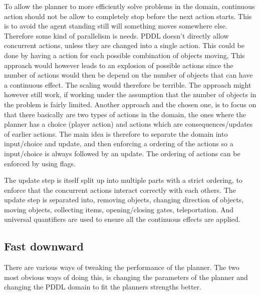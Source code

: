 	
	
	
	To allow the planner to more efficiently solve problems  in the domain, continuous action should not be allow to completely stop before the next action starts. This is to avoid the agent standing still will something moves somewhere else. Therefore some kind of parallelism is needs. PDDL doesn't directly allow concurrent actions, unless they are changed into a single action. This could be done by having a action for each possible combination of objects moving, This approach would however leads to an explosion of possible actions since the number of actions would then be depend on the number of objects that can have a continuous effect. The scaling would therefore be terrible. The approach might however still work, if working under the assumption that the number of objects in the problem is fairly limited. Another approach and the chosen one, is to focus on that there basically are two types of actions in the domain, the ones where the planner has a choice (player action) and actions which are consequences/updates of earlier actions. The main idea is therefore to separate the domain into input/choice and update, and then enforcing a ordering of the actions so a input/choice is always followed by an update. The ordering of actions can be enforced by using flags.	
		
	The update step is itself split up into multiple parts with a strict ordering, to enforce that the concurrent actions interact correctly with each others. The update step is separated into, removing objects, changing direction of objects, moving objects, collecting items, opening/closing gates, teleportation. And universal quantifiers are used to ensure all the continuous effects are applied.

	 
\subsection{Fast downward}
	There are various ways of tweaking the performance of the planner. The two most obvious ways of doing this, is changing the parameters of the planner and changing the PDDL domain to fit the planners strengths better.
	
